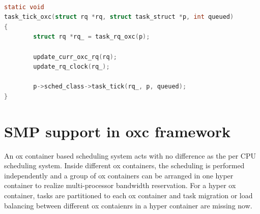 \begin{lstlisting}[language=C, label={lst:task_tick_oxc},
		caption={The most frequent called entry to update a container's runtime}]
			
static void 
task_tick_oxc(struct rq *rq, struct task_struct *p, int queued)
{
        struct rq *rq_ = task_rq_oxc(p);

        update_curr_oxc_rq(rq);
        update_rq_clock(rq_);

        p->sched_class->task_tick(rq_, p, queued);
}
\end{lstlisting}

\section{SMP support in oxc framework}
An ox container based scheduling system acts with no difference as the 
per CPU scheduling system. Inside different ox containers, the 
scheduling is performed independently and a group of ox containers
can be arranged in one hyper container to realize multi-processor 
bandwidth reservation. For a hyper ox container, tasks are partitioned 
to each ox container and task migration or load balancing between 
different ox contaienrs in a hyper container are missing now.

